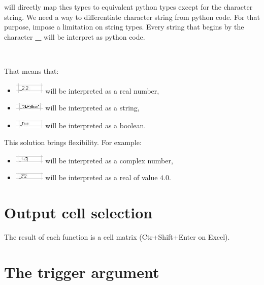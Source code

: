\xlp will directly map thes types to equivalent python types except for the character string. We need a way to differentiate character string from python code. For that purpose, \xlp impose a limitation on string types. Every string that begins by the character {\bf \_} will be interpret as python code.

\

That means that:

\begin{itemize}
\item \includegraphics[width=1.4cm]{images/preal.jpg} will be interpreted as a real number,
\item \includegraphics[width=1.4cm]{images/pstring.jpg} will be interpreted as a string,
\item \includegraphics[width=1.4cm]{images/pbool.jpg} will be interpreted as a boolean.
\end{itemize}

This solution brings flexibility. For example: 

\begin{itemize}
\item \includegraphics[width=1.4cm]{images/complex.jpg} will be interpreted as a complex number,
\item \includegraphics[width=1.4cm]{images/square.jpg} will be interpreted as a real of value $4.0$.
\end{itemize}

\section{Output cell selection}

The result of each function is a cell matrix (Ctr+Shift+Enter on Excel).

\section{The trigger argument}

